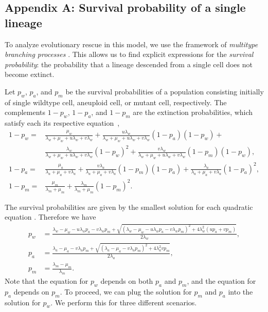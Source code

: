\documentclass[12pt]{extarticle}
\begin{document}
\begin{appendices}
\renewcommand{\theequation}{\thesection\arabic{equation}}


\section*{Appendix A: Survival probability of a single lineage}\label{sec:appendix-surv-prob}

To analyze evolutionary rescue in this model, we use the framework of \emph{multitype branching processes} \citep{harris1963theory, weissman2009rate}. 
This allows us to find explicit expressions for the \emph{survival probability}: the probability that a lineage descended from a single cell does not become extinct.

Let $p_w$, $p_a$, and $p_m$ be the survival probabilities of a population consisting initially of single wildtype cell, aneuploid cell, or mutant cell, respectively.
The complements $1-p_w$, $1-p_a$, and $1-p_m$ are the extinction probabilities, which satisfy each its respective equation~\citep{harris1963theory},
\begin{equation} \label{eq:extinction_prob}
\begin{aligned}
1-p_w = &\frac{\mu_w}{\lambda_w+\mu_w+u\lambda_w+v\lambda_w} + 
		  \frac{u\lambda_w}{\lambda_w+\mu_w+u\lambda_w+v\lambda_w}\left(1-p_a\right)\left(1-p_w\right) + \\
		  & \frac{\lambda_w}{\lambda_w+\mu_w+u\lambda_w+v\lambda_w}\left(1-p_w\right)^2 +
		  \frac{v\lambda_w}{\lambda_w+\mu_w+u\lambda_w+v\lambda_w}\left(1-p_m\right)\left(1-p_w\right) ,\\
1-p_a = &\frac{\mu_a}{\lambda_a+\mu_a+v\lambda_a}+\frac{v\lambda_a}{\lambda_a+\mu_a+v\lambda_a}\left(1-p_m\right)\left(1-p_a\right)+\frac{\lambda_a}{\lambda_a+\mu_a+v\lambda_a}\left(1-p_a\right)^2 ,\\
1-p_m = &\frac{\mu_m}{\lambda_m+\mu_m}+\frac{\lambda_m}{\lambda_m+\mu_m}\left(1-p_m\right)^2 .	 
\end{aligned}
\end{equation}

The survival probabilities are given by the smallest solution for each quadratic equation \citep{uecker2015adaptive}. Therefore we have
\begin{equation}\label{eq:survival_prob}
\begin{aligned}
p_w &= \frac{\lambda_w-\mu_w-u\lambda_wp_a-v\lambda_wp_m+\sqrt{\left(\lambda_w-\mu_w-u\lambda_wp_a-v\lambda_wp_m\right)^2+4\lambda_w^2\left(up_a+vp_m\right)}}{2\lambda_w} ,\\
p_a &= \frac{\lambda_a-\mu_a-v\lambda_ap_m+\sqrt{\left(\lambda_a-\mu_a-v\lambda_ap_m\right)^2+4\lambda_a^2vp_m}}{2\lambda_a}, \\
p_m &= \frac{\lambda_m-\mu_m}{\lambda_m} .
\end{aligned} 
\end{equation}
Note that the equation for $p_w$ depends on both $p_a$ and $p_m$, and the equation for $p_a$ depends on $p_m$.
To proceed, we can plug the solution for $p_m$ and $p_a$ into the solution for $p_w$. We perform this for three different scenarios.


\end{appendices}
\end{document}
